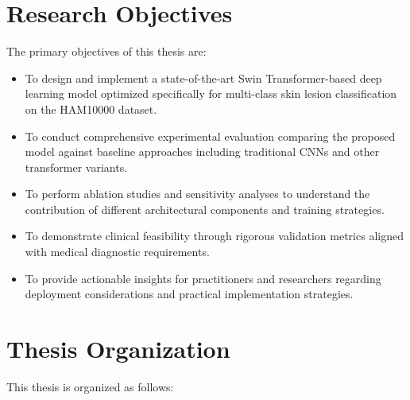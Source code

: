 \section{Research Objectives}

The primary objectives of this thesis are:

\begin{itemize}
    \item To design and implement a state-of-the-art Swin Transformer-based deep learning model optimized specifically for multi-class skin lesion classification on the HAM10000 dataset.
    
    \item To conduct comprehensive experimental evaluation comparing the proposed model against baseline approaches including traditional CNNs and other transformer variants.
    
    \item To perform ablation studies and sensitivity analyses to understand the contribution of different architectural components and training strategies.
    
    \item To demonstrate clinical feasibility through rigorous validation metrics aligned with medical diagnostic requirements.
    
    \item To provide actionable insights for practitioners and researchers regarding deployment considerations and practical implementation strategies.
\end{itemize}

\section{Thesis Organization}

This thesis is organized as follows:

